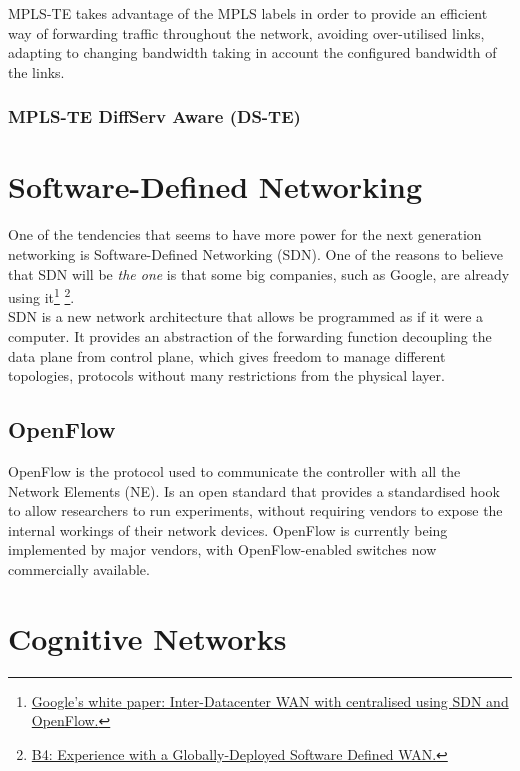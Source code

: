MPLS-TE takes advantage of the MPLS labels in order to provide an efficient way of forwarding traffic throughout the network, avoiding over-utilised links, adapting to changing bandwidth taking in account the configured bandwidth of the links.

\subsubsection{MPLS-TE DiffServ Aware (DS-TE)}


\section{Software-Defined Networking}
\label{sec:sdn}

One of the tendencies that seems to have more power for the next generation networking is Software-Defined Networking (SDN). One of the reasons to believe that SDN will be \emph{the one} is that some big companies, such as Google, are already using it\footnote{\href{http://goo.gl/F6sBR}{Google's white paper: Inter-Datacenter WAN with centralised using SDN and OpenFlow.}} \footnote{\href{http://cseweb.ucsd.edu/~vahdat/papers/b4-sigcomm13.pdf}{B4: Experience with a Globally-Deployed Software Defined WAN.}}.\\

SDN is a new network architecture that allows be programmed as if it were a computer. It provides an abstraction of the forwarding function decoupling the data plane from control plane, which gives freedom to manage different topologies, protocols without many restrictions from the physical layer.


\subsection{OpenFlow}
\label{sec:openflow}

OpenFlow is the protocol used to communicate the controller with all the Network Elements (NE). Is an open standard that provides a standardised hook to allow researchers to run experiments, without requiring vendors to expose the internal workings of their network devices. OpenFlow is currently being implemented by major vendors, with OpenFlow-enabled switches now commercially available.


\section{Cognitive Networks}

